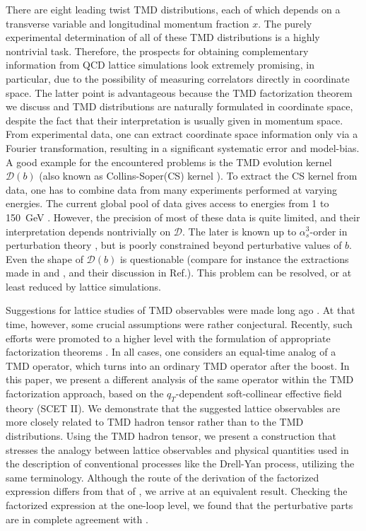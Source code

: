 \documentclass[a4paper, amsfonts, amssymb, amsmath, reprint, showkeys, nofootinbib, twoside]{revtex4-1}
\renewcommand{\(}{\left(}
\renewcommand{\)}{\right)}
\renewcommand{\[}{\left[}
\renewcommand{\]}{\right]}
\begin{document}
There are eight leading twist TMD distributions, each of which depends on a transverse variable and longitudinal momentum fraction $x$. The purely experimental determination of all of these TMD distributions is a highly nontrivial task. Therefore, the prospects for obtaining complementary information from QCD lattice simulations look extremely promising, in particular, due to the possibility of measuring correlators directly in coordinate space. The latter point is advantageous because the TMD factorization theorem we discuss and TMD distributions are naturally formulated in coordinate space, despite the fact that their interpretation is usually given in momentum space. From experimental data, one can extract coordinate space information only via a Fourier transformation, resulting in a significant systematic error and model-bias. A good example for the encountered problems is the TMD evolution kernel $\mathcal{D}(b)$ (also known as Collins-Soper(CS) kernel \cite{Collins:1981va}). To extract the CS kernel from data, one has to combine data from many experiments performed at varying energies. The current global pool of data gives access to energies from 1 to 150~GeV \cite{Scimemi:2019cmh}. However, the precision of most of these data is quite limited, and their interpretation depends nontrivially on $\mathcal{D}$. The later is known up to $\alpha_s^3$-order in perturbation theory \cite{Vladimirov:2016dll}, but is poorly constrained beyond perturbative values of $b$. Even the shape of $\mathcal{D}(b)$ is questionable (compare for instance the extractions made in \cite{Scimemi:2019cmh} and \cite{Bacchetta:2019sam}, and their discussion in  Ref.\cite{Vladimirov:2020umg}). This problem can be resolved, or at least reduced by lattice simulations.

Suggestions for lattice studies of TMD observables were made long ago \cite{Musch:2007ya,Musch:2010ka}. At that time, however, some crucial assumptions were rather conjectural. Recently, such efforts were promoted to a higher level with the formulation of appropriate factorization theorems \cite{Ebert:2018gzl,Ebert:2019okf,Ji:2019ewn}. In all cases, one considers an equal-time analog of a TMD operator, which turns into an ordinary TMD operator after the boost. In this paper, we present a different analysis of the same operator within the TMD factorization approach, based on the $q_T$-dependent soft-collinear effective field theory (SCET II). We demonstrate that the suggested lattice observables are more closely related to TMD hadron tensor rather than to the TMD distributions. Using the TMD hadron tensor, we present a construction that stresses the analogy between lattice observables and physical quantities used in the description of conventional processes like the Drell-Yan process, utilizing the same terminology.  Although the route of the derivation of the factorized expression differs from that of \cite{Ebert:2019okf,Ji:2019ewn}, we arrive at an equivalent result. Checking the factorized expression at the one-loop level, we found that the perturbative parts are in complete agreement with \cite{Ebert:2019okf}. 
\end{document}
